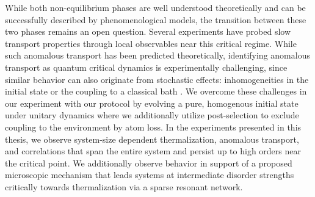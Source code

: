 While both non-equilibrium phases are well understood theoretically and can be successfully described by phenomenological models\cite{Serbyn2013b,Huse2014,Nandkishore2015}, the transition between these two phases remains an open question\cite{Grover2014,Vosk2015,Potter2015,Khemani2017,Alet2018,Abanin2018,Zhang2018}. Several experiments have probed slow transport properties through local observables near this critical regime\cite{Luschen2017,Bordia2017}. While such anomalous transport has been predicted theoretically\cite{Agarwal2015,Setiawan2017,Zhang2018}, identifying anomalous transport as quantum critical dynamics is experimentally challenging, since similar behavior can also originate from stochastic effects: inhomogeneities in the initial state\cite{Luitz2016} or the coupling to a classical bath \cite{Nandkishore2014,Luschen2017b}. We overcome these challenges in our experiment with our protocol by evolving a pure, homogenous initial state under unitary dynamics where we additionally utilize post-selection to exclude coupling to the environment by atom loss\cite{Luschen2017b,Lukin2019}. In the experiments presented in this thesis, we observe system-size dependent thermalization, anomalous transport, and correlations that span the entire system and persist up to high orders near the critical point\cite{Rispoli2018}. We additionally observe behavior in support of a proposed microscopic mechanism that leads systems at intermediate disorder strengths critically towards thermalization via a sparse resonant network\cite{Potter2015,Khemani2017,Rispoli2018,Herviou2019}. 

%
%
%

